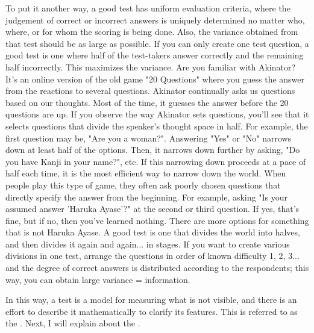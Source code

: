 \documentclass{ltjbook}
\begin{document}
To put it another way, a good test has uniform evaluation criteria, where the judgement of correct or incorrect answers is uniquely determined no matter who, where, or for whom the scoring is being done. Also, the variance obtained from that test should be as large as possible. If you can only create one test question, a good test is one where half of the test-takers answer correctly and the remaining half incorrectly. This maximizes the variance. Are you familiar with Akinator? It's an online version of the old game "20 Questions" where you guess the answer from the reactions to several questions. Akinator continually asks us questions based on our thoughts. Most of the time, it guesses the answer before the 20 questions are up. If you observe the way Akinator sets questions, you'll see that it selects questions that divide the speaker's thought space in half. For example, the first question may be, "Are you a woman?". Answering "Yes" or "No" narrows down at least half of the options. Then, it narrows down further by asking, "Do you have Kanji in your name?", etc. If this narrowing down proceeds at a pace of half each time, it is the most efficient way to narrow down the world. When people play this type of game, they often ask poorly chosen questions that directly specify the answer from the beginning. For example, asking "Is your assumed answer 'Haruka Ayase'?" at the second or third question. If yes, that's fine, but if no, then you've learned nothing. There are more options for something that is not Haruka Ayase. A good test is one that divides the world into halves, and then divides it again and again... in stages. If you want to create various divisions in one test, arrange the questions in order of known difficulty 1, 2, 3... and the degree of correct answers is distributed according to the respondents; this way, you can obtain large variance = information.

In this way, a test is a model for measuring what is not visible, and there is an effort to describe it mathematically to clarify its features. This is referred to as the . Next, I will explain about the .
\end{document}
